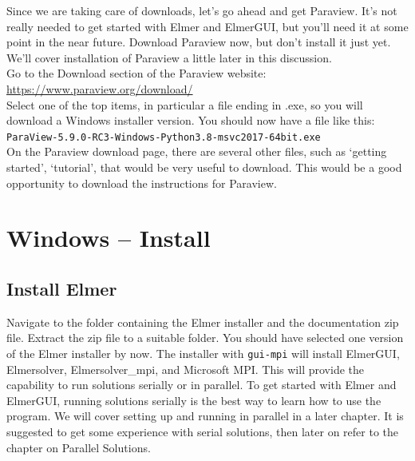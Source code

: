 Since we are taking care of downloads, let's go ahead and get Paraview.  It's not really needed to get started with Elmer and ElmerGUI, but you'll need it at some point in the near future.  Download Paraview now, but don't install it just yet.  We'll cover installation of Paraview a little later in this discussion.\\

Go to the Download section of the Paraview website:\\

 \url{https://www.paraview.org/download/}\\

Select one of the top items, in particular a file ending in .exe, so you will download a Windows installer version.  You should now have a file like this:\\

\texttt{ParaView-5.9.0-RC3-Windows-Python3.8-msvc2017-64bit.exe}\\

On the Paraview download page, there are several other files, such as `getting started', `tutorial', that would be very useful to download.  This would be a good opportunity to download the instructions for Paraview.



\chapter{Windows -- Install}

\section{Install Elmer}

Navigate to the folder containing the Elmer installer and the documentation zip file.  Extract the zip file to a suitable folder.  You should have selected one version of the Elmer installer by now.  The installer with \texttt{gui-mpi} will install ElmerGUI, Elmersolver, Elmersolver\_mpi, and Microsoft MPI.  This will provide the capability to run solutions serially or in parallel.  To get started with Elmer and ElmerGUI, running solutions serially is the best way to learn how to use the program.  We will cover setting up and running in parallel in a later chapter.  It is suggested to get some experience with serial solutions, then later on refer to the chapter on Parallel Solutions.\\

